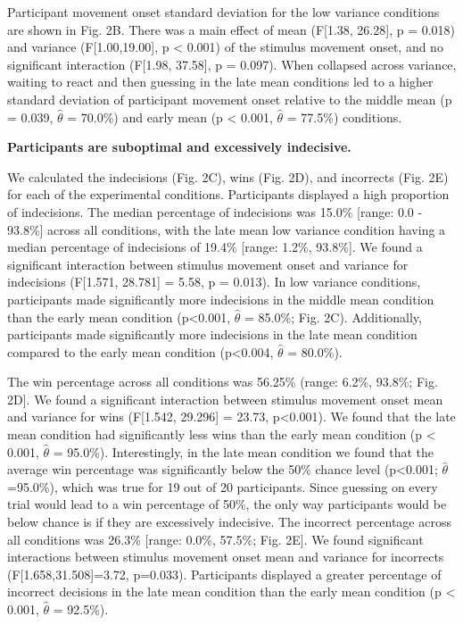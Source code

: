 \documentclass[12pt,letterpaper]{article}
\begin{document}
Participant movement onset standard deviation for the low variance conditions are shown in Fig. 2B. There was a main effect of mean (F[1.38, 26.28], p = 0.018) and variance (F[1.00,19.00], p < 0.001) of the stimulus movement onset, and no significant interaction (F[1.98, 37.58], p = 0.097). When collapsed across variance, waiting to react and then guessing in the late mean conditions led to a higher standard deviation of participant movement onset relative to the middle mean (p = 0.039, $\hat{\theta}$ = 70.0\%) and early mean (p < 0.001, $\hat{\theta}$ = 77.5\%) conditions.

\noindent\textbf{\textcolor{mydarkblue}{{Participants are suboptimal and excessively indecisive.}}}

We calculated the indecisions (Fig. 2C), wins (Fig. 2D), and incorrects (Fig. 2E) for each of the experimental conditions. Participants displayed a high proportion of indecisions. The median percentage of indecisions was 15.0\% [range: 0.0 - 93.8\%] across all conditions, with the late mean low variance condition having a median percentage of indecisions of 19.4\% [range: 1.2\%, 93.8\%]. We found a significant interaction between stimulus movement onset and variance for indecisions (F[1.571, 28.781] = 5.58, p = 0.013). In low variance conditions, participants made significantly more indecisions in the middle mean condition than the early mean condition (p<0.001, $\hat{\theta}$ = 85.0\%; Fig. 2C). Additionally, participants made significantly more indecisions in the late mean condition compared to the early mean condition (p<0.004, $\hat{\theta}$ = 80.0\%).

The win percentage across all conditions was 56.25\% (range: 6.2\%, 93.8\%; Fig. 2D]. We found a significant interaction between stimulus movement onset mean and variance for wins (F[1.542, 29.296] = 23.73, p<0.001). We found that the late mean condition had significantly less wins than the early mean condition (p < 0.001, $\hat{\theta}$ = 95.0\%). Interestingly, in the late mean condition we found that the average win percentage was significantly below the 50\% chance level (p<0.001; $\hat{\theta}$=95.0\%), which was true for 19 out of 20 participants. Since guessing on every trial would lead to a win percentage of 50\%, the only way participants would be below chance is if they are excessively indecisive.
The incorrect percentage across all conditions was 26.3\% [range: 0.0\%, 57.5\%; Fig. 2E]. We found significant interactions between stimulus movement onset mean and variance for incorrects (F[1.658,31.508]=3.72, p=0.033). Participants displayed a greater percentage of incorrect decisions in the late mean condition than the early mean condition (p < 0.001, $\hat{\theta}$ = 92.5\%).
\end{document}
